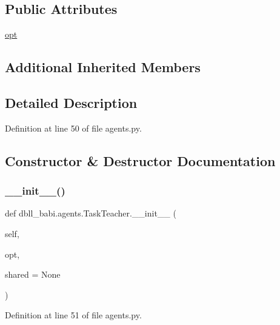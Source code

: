 \subsection*{Public Attributes}
\begin{DoxyCompactItemize}
\item 
\hyperlink{classdbll__babi_1_1agents_1_1TaskTeacher_abe6872d5eda75ca8a15ecf4785086c48}{opt}
\end{DoxyCompactItemize}
\subsection*{Additional Inherited Members}


\subsection{Detailed Description}


Definition at line 50 of file agents.\+py.



\subsection{Constructor \& Destructor Documentation}
\mbox{\label{classdbll__babi_1_1agents_1_1TaskTeacher_a98b7cf17bf8248372e08889b3fe30ac5}} 
\subsubsection{\texorpdfstring{\+\_\+\+\_\+init\+\_\+\+\_\+()}{\_\_init\_\_()}}
{\footnotesize\ttfamily def dbll\+\_\+babi.\+agents.\+Task\+Teacher.\+\_\+\+\_\+init\+\_\+\+\_\+ (\begin{DoxyParamCaption}\item[{}]{self,  }\item[{}]{opt,  }\item[{}]{shared = {\ttfamily None} }\end{DoxyParamCaption})}



Definition at line 51 of file agents.\+py.


